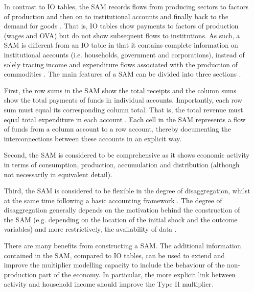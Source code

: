 \bigskip

In contrast to IO tables, the SAM records flows from producing sectors to factors of production and then on to institutional accounts and finally back to the demand for goods \cite{Adelman1986a}. That is, IO tables show payments to factors of production (wages and OVA) but do not show subsequent flows to institutions. As such, a SAM is different from an IO table in that it contains complete information on institutional accounts (i.e. households, government and corporations), instead of solely tracing income and expenditure flows associated with the production of commodities . The main features of a SAM can be divided into three sections \cite{Round2003a}.

\bigskip

First, the row sums in the SAM show the total receipts and the column sums show the total payments of funds in individual accounts. Importantly, each row sum must equal its corresponding column total. That is, the total revenue must equal total expenditure in each account . Each cell in the SAM represents a flow of funds from a column account to a row account, thereby documenting the interconnections between these accounts in an explicit way.

\bigskip

Second, the SAM is considered to be comprehensive as it shows economic activity in terms of consumption, production, accumulation and distribution (although not necessarily in equivalent detail).

\bigskip

Third, the SAM is considered to be flexible in the degree of disaggregation, whilst at the same time following a basic accounting framework . The degree of disaggregation generally depends on the motivation behind the construction of the SAM (e.g. depending on the location of the initial shock and the outcome
variables) and more restrictively, the availability of data \cite{Round2003a}.

\bigskip

There are many benefits from constructing a SAM. The additional information contained in the SAM, compared to IO tables, can be used to extend and improve the multiplier modelling capacity to include the behaviour of the non-production part of the economy. In particular, the more explicit link between activity and household income should improve the Type II multiplier.

